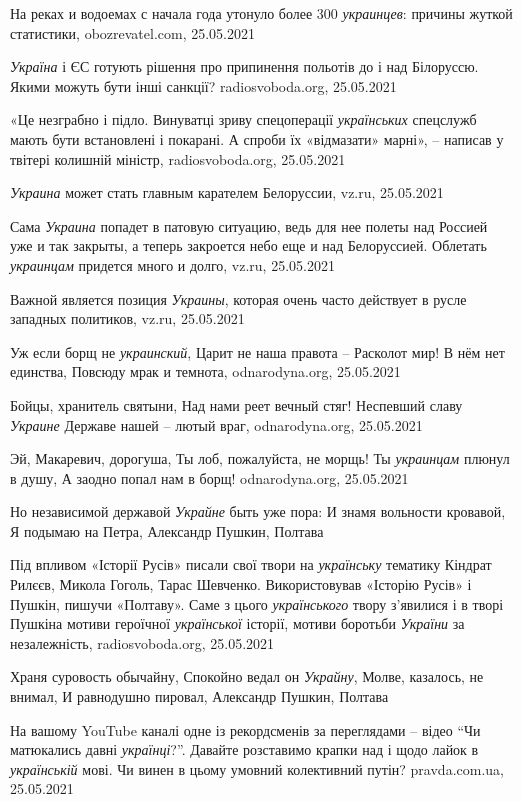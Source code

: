 На реках и водоемах с начала года утонуло более 300 \emph{украинцев}: причины жуткой
статистики, obozrevatel.com, 25.05.2021

\emph{Україна} і ЄС готують рішення про припинення польотів до і над Білоруссю.
Якими можуть бути інші санкції? radiosvoboda.org, 25.05.2021

«Це незграбно і підло. Винуватці зриву спецоперації \emph{українських}
спецслужб мають бути встановлені і покарані. А спроби їх «відмазати» марні», –
написав у твітері колишній міністр, radiosvoboda.org, 25.05.2021

\emph{Украина} может стать главным карателем Белоруссии, vz.ru, 25.05.2021

Сама \emph{Украина} попадет в патовую ситуацию, ведь для нее полеты над Россией
уже и так закрыты, а теперь закроется небо еще и над Белоруссией. Облетать
\emph{украинцам} придется много и долго, vz.ru, 25.05.2021

Важной является позиция \emph{Украины}, которая очень часто действует в русле западных политиков,
vz.ru, 25.05.2021

Уж если борщ не \emph{украинский}, Царит не наша правота – Расколот мир! В нём нет
единства, Повсюду мрак и темнота, odnarodyna.org, 25.05.2021

Бойцы, хранитель святыни, Над нами реет вечный стяг!  Неспевший славу \emph{Украине}
Державе нашей – лютый враг, odnarodyna.org, 25.05.2021

Эй, Макаревич, дорогуша, Ты лоб, пожалуйста, не морщь!  Ты \emph{украинцам} плюнул в
душу, А заодно попал нам в борщ!
odnarodyna.org, 25.05.2021

Но независимой державой \emph{Украйне} быть уже пора: И знамя вольности
кровавой, Я подымаю на Петра, Александр Пушкин, Полтава

Під впливом «Історії Русів» писали свої твори на \emph{українську} тематику
Кіндрат Рилєєв, Микола Гоголь, Тарас Шевченко. Використовував «Історію Русів» і
Пушкін, пишучи «Полтаву». Саме з цього \emph{українського} твору з'явилися і в
творі Пушкіна мотиви героїчної \emph{української} історії, мотиви боротьби
\emph{України} за незалежність, radiosvoboda.org, 25.05.2021

Храня суровость обычайну, Спокойно ведал он \emph{Украйну}, Молве, казалось, не
внимал, И равнодушно пировал, Александр Пушкин, Полтава

На вашому YouTube каналі одне із рекордсменів за переглядами – відео
\enquote{Чи матюкались давні \emph{українці}?}. Давайте розставимо крапки над і
щодо лайок в \emph{українській} мові. Чи винен в цьому умовний колективний
путін?  pravda.com.ua, 25.05.2021

